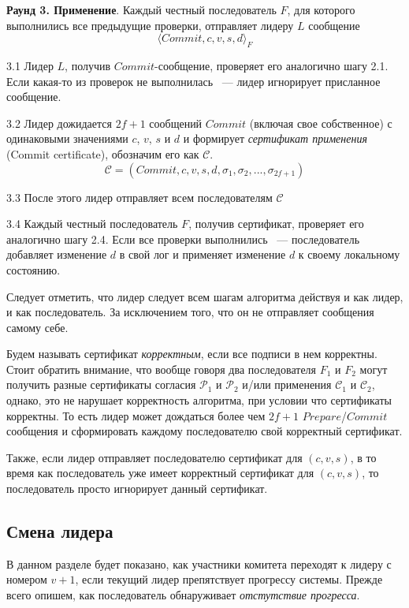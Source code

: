 \textbf{Раунд 3. Применение}.
Каждый честный последователь $F$, для которого выполнились все предыдущие проверки, отправляет лидеру $L$ сообщение 
\[ \langle Commit, c, v, s, d \rangle_F \]

3.1 Лидер $L$, получив $Commit$-сообщение, проверяет его аналогично шагу 2.1.
Если какая-то из проверок не выполнилась ~--- лидер игнорирует присланное сообщение. 

3.2 Лидер дожидается $2f+1$ сообщений $Commit$ (включая свое собственное) с одинаковыми значениями $c$, $v$, $s$ и $d$ и формирует \textit{сертификат применения} (Commit certificate), обозначим его как $\mathcal{C}$.
$$\mathcal{C}=(Commit, c, v, s, d, \sigma_1, \sigma_2, ..., \sigma_{2f+1})$$

3.3 После этого лидер отправляет всем последователям  $\mathcal{C}$

3.4 Каждый честный последователь $F$, получив сертификат, проверяет его аналогично шагу 2.4.
Если все проверки выполнились ~--- последователь добавляет изменение $d$ в свой лог и  применяет изменение $d$ к своему локальному состоянию.
\vspace{10pt}

Следует отметить, что лидер следует всем шагам алгоритма действуя и как лидер, и как последователь. За исключением того, что он не отправляет сообщения самому себе.

Будем называть сертификат \textit{корректным}, если все подписи в нем корректны.
Стоит обратить внимание, что вообще говоря два последователя $F_1$ и $F_2$ могут получить разные сертификаты согласия $\mathcal{P}_1$ и $\mathcal{P}_2$ и/или применения $\mathcal{C}_1$ и $\mathcal{C}_2$, однако, это не нарушает корректность алгоритма, при условии что сертификаты корректны.
То есть лидер может дождаться более чем $2f+1$ $Prepare$/$Commit$ сообщения и сформировать каждому последователю свой корректный сертификат.

Также, если лидер отправляет последователю сертификат для $(c, v, s)$, в то время как последователь уже имеет корректный сертификат для $(c, v, s)$, то последователь просто игнорирует данный сертификат.

\subsection{Смена лидера} \label{leader-change}
В данном разделе будет показано, как участники комитета переходят к лидеру с номером $v+1$, если текущий лидер препятствует прогрессу системы. Прежде всего опишем, как последователь обнаруживает \textit{отстутствие прогресса}.

